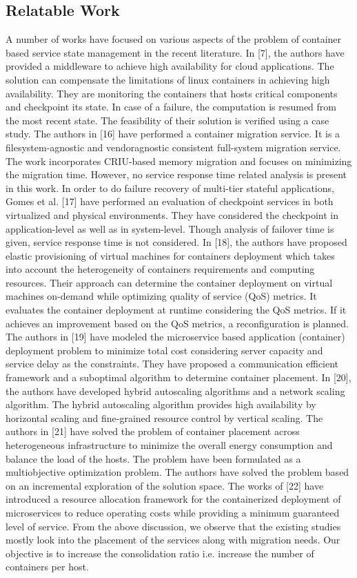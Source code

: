 \subsection{Relatable Work}
A number of works have focused on various aspects of
the problem of container based service state management
in the recent literature. In [7], the authors have provided a
middleware to achieve high availability for cloud applications.
The solution can compensate the limitations of linux containers in achieving high availability. They are monitoring the
containers that hosts critical components and checkpoint its
state. In case of a failure, the computation is resumed from
the most recent state. The feasibility of their solution is verified
using a case study. The authors in [16] have performed a
container migration service. It is a filesystem-agnostic and
vendoragnostic consistent full-system migration service. The
work incorporates CRIU-based memory migration and focuses on minimizing the migration time. However, no service
response time related analysis is present in this work. In
order to do failure recovery of multi-tier stateful applications,
Gomes et al. [17] have performed an evaluation of checkpoint
services in both virtualized and physical environments. They
have considered the checkpoint in application-level as well
as in system-level. Though analysis of failover time is given,
service response time is not considered. In [18], the authors
have proposed elastic provisioning of virtual machines for
containers deployment which takes into account the heterogeneity of containers requirements and computing resources.
Their approach can determine the container deployment on
virtual machines on-demand while optimizing quality of service (QoS) metrics. It evaluates the container deployment
at runtime considering the QoS metrics. If it achieves an improvement based on the QoS metrics, a reconfiguration
is planned. The authors in [19] have modeled the microservice based application (container) deployment problem to
minimize total cost considering server capacity and service delay as the constraints. They have proposed a communication
efficient framework and a suboptimal algorithm to determine
container placement. In [20], the authors have developed
hybrid autoscaling algorithms and a network scaling algorithm.
The hybrid autoscaling algorithm provides high availability
by horizontal scaling and fine-grained resource control by
vertical scaling. The authors in [21] have solved the problem
of container placement across heterogeneous infrastructure to
minimize the overall energy consumption and balance the load
of the hosts. The problem have been formulated as a multiobjective optimization problem. The authors have solved the
problem based on an incremental exploration of the solution
space. The works of [22] have introduced a resource allocation
framework for the containerized deployment of microservices
to reduce operating costs while providing a minimum guaranteed level of service. From the above discussion, we observe
that the existing studies mostly look into the placement of
the services along with migration needs. Our objective is to
increase the consolidation ratio i.e. increase the number of
containers per host.





